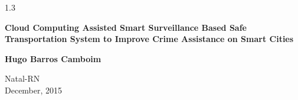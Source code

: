 \begin{titlepage}
\begin{center}
		\vspace{6cm}
						
		{\setlength{\baselineskip}%
		{1.3\baselineskip}

		{\LARGE \textbf{Cloud Computing Assisted Smart Surveillance Based Safe Transportation System to Improve Crime Assistance on Smart Cities}}\par} 

		

			
		\vspace{3cm}
			
		{\large \textbf{Hugo Barros Camboim}}
						
		\vspace{6cm}
		
		Natal-RN\\December, 2015
	\end{center}
\end{titlepage}